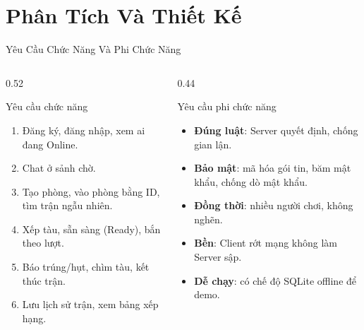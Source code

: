 \section{Phân Tích Và Thiết Kế}

\begin{frame}{Yêu Cầu Chức Năng Và Phi Chức Năng}
  \begin{columns}[T]
    \begin{column}{0.52\textwidth}
      \begin{block}{Yêu cầu chức năng}
        \begin{enumerate}\setlength{\itemsep}{0pt}
          \item Đăng ký, đăng nhập, xem ai đang Online.
          \item Chat ở sảnh chờ.
          \item Tạo phòng, vào phòng bằng ID, tìm trận ngẫu nhiên.
          \item Xếp tàu, sẵn sàng (Ready), bắn theo lượt.
          \item Báo trúng/hụt, chìm tàu, kết thúc trận.
          \item Lưu lịch sử trận, xem bảng xếp hạng.
        \end{enumerate}
      \end{block}
    \end{column}
    \begin{column}{0.44\textwidth}
      \begin{alertblock}{Yêu cầu phi chức năng}
        \begin{itemize}\setlength{\itemsep}{0pt}
          \item \textbf{Đúng luật}: Server quyết định, chống gian lận.
          \item \textbf{Bảo mật}: mã hóa gói tin, băm mật khẩu, chống dò mật khẩu.
          \item \textbf{Đồng thời}: nhiều người chơi, không nghẽn.
          \item \textbf{Bền}: Client rớt mạng không làm Server sập.
          \item \textbf{Dễ chạy}: có chế độ SQLite offline để demo.
        \end{itemize}
      \end{alertblock}
    \end{column}
  \end{columns}
\end{frame}

